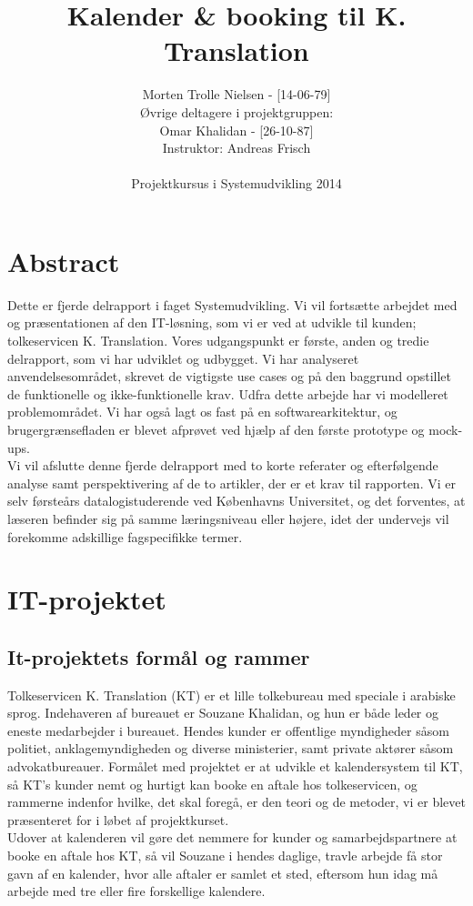 \documentclass[12pt]{article}   %
\title{Kalender \& booking til K. Translation}
\author{Morten Trolle Nielsen - [14-06-79]\\ 
Øvrige deltagere i projektgruppen:\\
Omar Khalidan - [26-10-87]\\
    Instruktor: Andreas Frisch\\ \\
Projektkursus i Systemudvikling 2014 }
\begin{document}
\maketitle
\thispagestyle{empty}
\newpage
\tableofcontents
\newpage

\section{Abstract}
Dette er fjerde delrapport i faget Systemudvikling. Vi vil fortsætte arbejdet med og præsentationen af den IT-løsning, som vi er ved at udvikle til kunden; tolkeservicen K. Translation. Vores udgangspunkt er første, anden og tredie delrapport, som vi har udviklet og udbygget. Vi har analyseret anvendelsesområdet, skrevet de vigtigste use cases og på den baggrund opstillet de funktionelle og ikke-funktionelle krav. Udfra dette arbejde har vi modelleret problemområdet. Vi har også lagt os fast på en softwarearkitektur, og brugergrænsefladen er blevet afprøvet ved hjælp af den første prototype og mock-ups.  \\
Vi vil afslutte denne fjerde delrapport med to korte referater og efterfølgende analyse samt perspektivering af de to artikler, der er et krav til rapporten. Vi er selv førsteårs datalogistuderende ved Københavns Universitet, og det forventes, at læseren befinder sig på samme læringsniveau eller højere, idet der undervejs vil forekomme adskillige fagspecifikke termer. 

\newpage
\section{IT-projektet}
\subsection{It-projektets formål og rammer}

Tolkeservicen K. Translation (KT) er et lille tolkebureau med speciale i arabiske sprog. Indehaveren af bureauet er Souzane Khalidan, og hun er både leder og eneste medarbejder i bureauet. Hendes kunder er offentlige myndigheder såsom politiet, anklagemyndigheden og diverse ministerier, samt private aktører såsom advokatbureauer. Formålet med projektet er at udvikle et kalendersystem til KT, så KT's kunder nemt og hurtigt kan booke en aftale hos tolkeservicen, og rammerne indenfor hvilke, det skal foregå, er den teori og de metoder, vi er blevet præsenteret for i løbet af projektkurset. \\
\indent Udover at kalenderen vil gøre det nemmere for kunder og samarbejdspartnere at booke en aftale hos KT, så vil Souzane i hendes daglige, travle arbejde få stor gavn af en kalender, hvor alle aftaler er samlet et sted, eftersom hun idag må arbejde med tre eller fire forskellige kalendere. 
\end{document}
